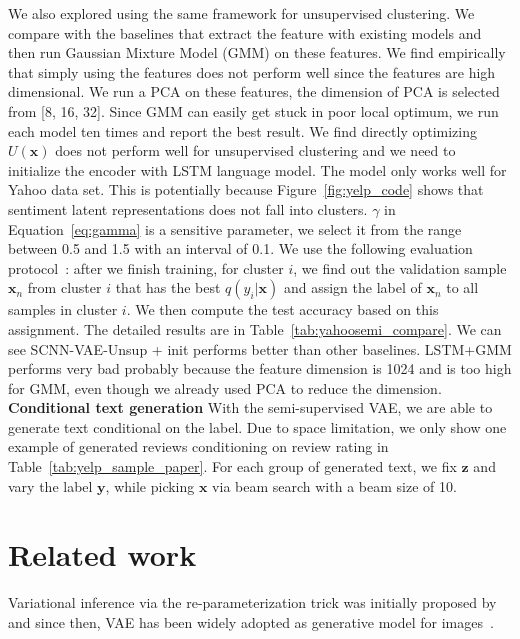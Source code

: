 \documentclass{article}
\begin{document}
We also explored using the same framework for unsupervised
clustering. We compare with the baselines that extract the feature with
existing models and then run Gaussian Mixture Model (GMM) on these features. We
find empirically that simply using the features does not perform well since the
features are high dimensional. We run a PCA on these features, the dimension of
PCA is selected from [8, 16, 32]. Since GMM can easily get stuck in poor local
optimum, we run each model ten times and report the best result.
We find directly optimizing $U(\mathbf{x})$ does not perform well for unsupervised
clustering and we need to initialize the encoder with LSTM language model. The
model only works well for Yahoo data set. This is potentially because
Figure~\ref{fig:yelp_code} shows that sentiment latent representations does
not fall into clusters. $\gamma$ in Equation~\ref{eq:gamma} is a sensitive parameter,
we select it from the range between 0.5 and 1.5 with an interval of 0.1.
We use the following evaluation protocol~\cite{makhzani2015adversarial}: after we
finish training, for cluster $i$, we find out the validation sample $\mathbf{x}_n$ from cluster $i$
that has the best $q(y_i|\mathbf{x})$ and assign the label of $\mathbf{x}_n$ to all samples in
cluster $i$. We then compute the test accuracy based on this assignment.
The detailed results are in Table~\ref{tab:yahoosemi_compare}. We can see
SCNN-VAE-Unsup + init performs better than other baselines. LSTM+GMM performs very
bad probably because the feature dimension is 1024 and is too high for
GMM, even though we already used PCA to reduce the dimension.
\\[0.2cm]
{\bf Conditional text generation}
With the semi-supervised VAE, we are able to generate text conditional on the
label. Due to space limitation, we only show one example of generated reviews
conditioning on review rating in Table~\ref{tab:yelp_sample_paper}.
For
each group of generated text, we fix $\mathbf{z}$ and vary the label $\mathbf{y}$, while picking $\mathbf{x}$ via beam search with a beam size of 10.

\section{Related work}
Variational inference via the re-parameterization trick was initially proposed
by~\cite{kingma2013auto, rezende2014stochastic} and since then, VAE has been
widely adopted as generative model for images~\cite{gregor2015draw,
  yan2016attribute2image, salimans2015markov, gregor2016towards, hu2017unifying}.
\end{document}
